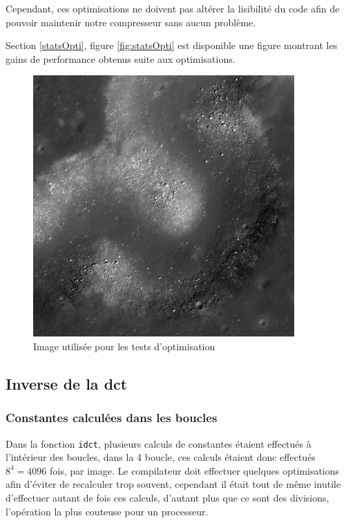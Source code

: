 \documentclass[a4paper, 11pt]{article}
\begin{document}
	\begin{remarque}
	Cependant, ces optimisations ne doivent pas altérer la lisibilité du code afin de pouvoir maintenir notre compresseur sans aucun problème.
	\end{remarque}

	Section \ref{statsOpti}, figure \ref{fig:statsOpti} est disponible une figure montrant les gains de performance obtenus suite aux optimisations.

	\begin{figure}[H]
		\centering
		\includegraphics[width=10cm]{nasa.jpg}
		\caption{Image utilisée pour les tests d'optimisation}
		\label{fig:nasa}
	\end{figure}
	
	\subsection{Inverse de la dct}\label{idct}
	\subsubsection{Constantes calculées dans les boucles}
	Dans la fonction \texttt{idct}, plusieurs calculs de constantes étaient effectués à l'intérieur des boucles, dans la 4\ieme{} boucle, ces calculs étaient donc effectués
	$8^4 = 4096$ fois, par image. Le compilateur doit effectuer quelques optimisations afin d'éviter de recalculer trop souvent, cependant il était tout de même
	inutile d'effectuer autant de fois ces calculs, d'autant plus que ce sont des divisions, l'opération la plus couteuse pour un processeur.
\end{document}
